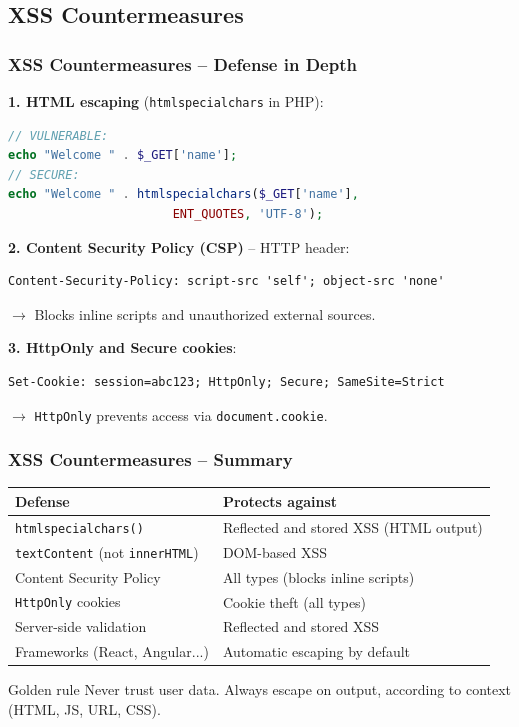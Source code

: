 \documentclass{beamer}
\def\emptyline{\vspace{10pt}}
\begin{document}
\subsection{XSS Countermeasures}

\begin{frame}[fragile]
\frametitle{XSS Countermeasures -- Defense in Depth}

\textbf{1. HTML escaping} (\texttt{htmlspecialchars} in PHP):
\begin{lstlisting}[language=PHP]
// VULNERABLE:
echo "Welcome " . $_GET['name'];
// SECURE:
echo "Welcome " . htmlspecialchars($_GET['name'],
                       ENT_QUOTES, 'UTF-8');
\end{lstlisting}

\textbf{2. Content Security Policy (CSP)} -- HTTP header:
\begin{lstlisting}[basicstyle=\ttfamily\scriptsize,frame=single]
Content-Security-Policy: script-src 'self'; object-src 'none'
\end{lstlisting}
$\rightarrow$ Blocks inline scripts and unauthorized external sources.

\emptyline
\textbf{3. HttpOnly and Secure cookies}:
\begin{lstlisting}[basicstyle=\ttfamily\scriptsize,frame=single]
Set-Cookie: session=abc123; HttpOnly; Secure; SameSite=Strict
\end{lstlisting}
$\rightarrow$ \texttt{HttpOnly} prevents access via \texttt{document.cookie}.
\end{frame}


\begin{frame}
\frametitle{XSS Countermeasures -- Summary}

\begin{scriptsize}
\begin{tabular}{|p{3.5cm}|p{5.5cm}|}
\hline
\textbf{Defense} & \textbf{Protects against} \\
\hline
\texttt{htmlspecialchars()} & Reflected and stored XSS (HTML output) \\
\hline
\texttt{textContent} (not \texttt{innerHTML}) & DOM-based XSS \\
\hline
Content Security Policy & All types (blocks inline scripts) \\
\hline
\texttt{HttpOnly} cookies & Cookie theft (all types) \\
\hline
Server-side validation & Reflected and stored XSS \\
\hline
Frameworks (React, Angular...) & Automatic escaping by default \\
\hline
\end{tabular}
\end{scriptsize}

\emptyline
\begin{block}{Golden rule}
\alert{Never trust user data.} Always escape on output, according to context (HTML, JS, URL, CSS).
\end{block}
\end{frame}
\end{document}
